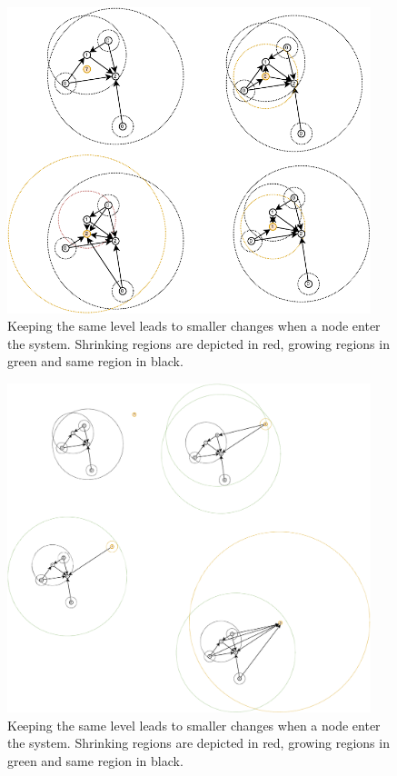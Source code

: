 \documentclass[a4paper,11pt,oneside]{report}
\begin{document}
\begin{figure}[!h] 
\centering
\includegraphics[width=300pt]{figures/LocarnoTreaties-Insertion-close}
\caption{Keeping the same level leads to smaller changes when a node enter the
    system. Shrinking regions are depicted in red, growing regions in green and
    same region in black.} \label{fig:LocarnoTreaties-Insertion-close}
\end{figure}

\begin{figure}[!h] 
\centering
\includegraphics[width=300pt]{figures/LocarnoTreaties-Insertion-far}
\caption{Keeping the same level leads to smaller changes when a node enter the
    system. Shrinking regions are depicted in red, growing regions in green and
    same region in black.} \label{fig:LocarnoTreaties-Insertion-far}
\end{figure}
\end{document}
